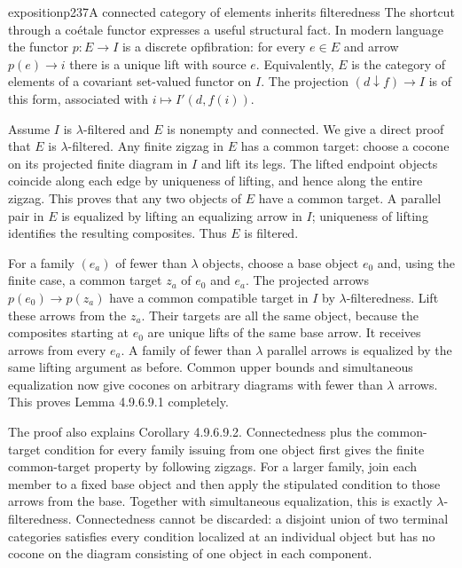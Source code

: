 \begin{dcomment}{exposition}{p237}{A connected category of elements inherits filteredness}
The shortcut through a coétale functor expresses a useful structural fact.  In modern language the functor $p:E\to I$ is a discrete opfibration: for every $e\in E$ and arrow $p(e)\to i$ there is a unique lift with source $e$.  Equivalently, $E$ is the category of elements of a covariant set-valued functor on $I$.  The projection $(d\downarrow f)\to I$ is of this form, associated with $i\mapsto I'(d,f(i))$.

Assume $I$ is $\lambda$-filtered and $E$ is nonempty and connected.  We give a direct proof that $E$ is $\lambda$-filtered.  Any finite zigzag in $E$ has a common target: choose a cocone on its projected finite diagram in $I$ and lift its legs.  The lifted endpoint objects coincide along each edge by uniqueness of lifting, and hence along the entire zigzag.  This proves that any two objects of $E$ have a common target.  A parallel pair in $E$ is equalized by lifting an equalizing arrow in $I$; uniqueness of lifting identifies the resulting composites.  Thus $E$ is filtered.

For a family $(e_a)$ of fewer than $\lambda$ objects, choose a base object $e_0$ and, using the finite case, a common target $z_a$ of $e_0$ and $e_a$.  The projected arrows $p(e_0)\to p(z_a)$ have a common compatible target in $I$ by $\lambda$-filteredness.  Lift these arrows from the $z_a$.  Their targets are all the same object, because the composites starting at $e_0$ are unique lifts of the same base arrow.  It receives arrows from every $e_a$.  A family of fewer than $\lambda$ parallel arrows is equalized by the same lifting argument as before.  Common upper bounds and simultaneous equalization now give cocones on arbitrary diagrams with fewer than $\lambda$ arrows.  This proves Lemma 4.9.6.9.1 completely.

The proof also explains Corollary 4.9.6.9.2.  Connectedness plus the common-target condition for every family issuing from one object first gives the finite common-target property by following zigzags.  For a larger family, join each member to a fixed base object and then apply the stipulated condition to those arrows from the base.  Together with simultaneous equalization, this is exactly $\lambda$-filteredness.  Connectedness cannot be discarded: a disjoint union of two terminal categories satisfies every condition localized at an individual object but has no cocone on the diagram consisting of one object in each component.
\end{dcomment}

